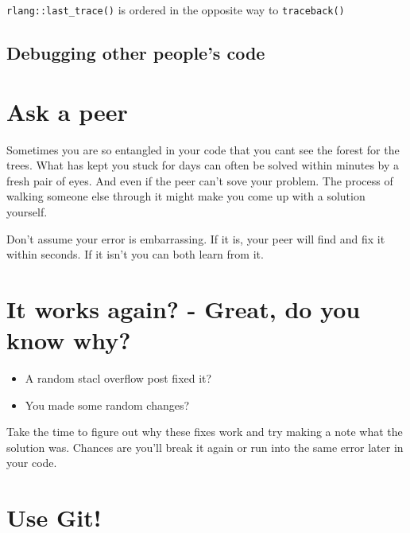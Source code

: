 \documentclass[]{book}
\providecommand{\tightlist}{%
  \setlength{\itemsep}{0pt}\setlength{\parskip}{0pt}}
\begin{document}
\texttt{rlang::last\_trace()} is ordered in the opposite way to \texttt{traceback()}

\hypertarget{debugging-other-peoples-code}{%
\section{Debugging other people's code}\label{debugging-other-peoples-code}}

\hypertarget{ask-a-peer}{%
\chapter{Ask a peer}\label{ask-a-peer}}

Sometimes you are so entangled in your code that you cant see the forest for the trees.
What has kept you stuck for days can often be solved within minutes by a fresh pair of eyes.
And even if the peer can't sove your problem.
The process of walking someone else through it might make you come up with a solution yourself.

Don't assume your error is embarrassing.
If it is, your peer will find and fix it within seconds.
If it isn't you can both learn from it.

\hypertarget{it-works-again---great-do-you-know-why}{%
\chapter{It works again? - Great, do you know why?}\label{it-works-again---great-do-you-know-why}}

\begin{itemize}
\tightlist
\item
  A random stacl overflow post fixed it?
\item
  You made some random changes?
\end{itemize}

Take the time to figure out why these fixes work and try making a note what
the solution was. Chances are you'll break it again or run into the
same error later in your code.

\hypertarget{use-git}{%
\chapter{Use Git!}\label{use-git}}
\end{document}
